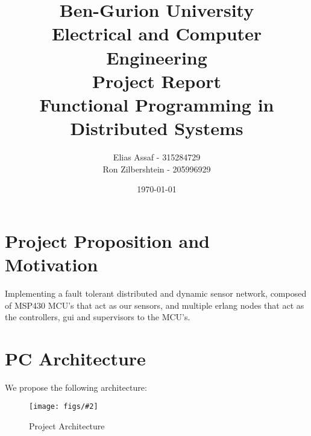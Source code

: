 \documentclass{article}
\title{Ben-Gurion University\\Electrical and Computer Engineering\\\Large{Project Report\\Functional Programming in Distributed Systems}}
\author{Elias Assaf - 315284729\\
        Ron Zilbershtein - 205996929}
\date{\today}
\newcommand{\myfig}[4]{
\begin{figure}[h]
    \centering
    \captionsetup{justification=centering}
    \texttt{[image: figs/\#2]}
    \caption{#3}
    \label{fig:#4}
\end{figure}
}
\begin{document}
\maketitle
\tableofcontents
\newpage
 \section{Project Proposition and Motivation}
 Implementing a fault tolerant distributed and dynamic sensor network, composed of MSP430 MCU's that act as our sensors, and multiple erlang nodes that act as the controllers, gui and supervisors to the MCU's.
 
\section{PC Architecture}
We propose the following architecture:
\myfig{0.9}{Project_flow.drawio.png}{Project Architecture}{}\\
 
\end{document}
